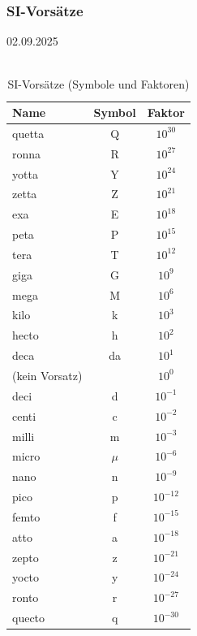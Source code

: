\documentclass[11pt,a4paper,oneside]{article}
\newcommand{\lessondate}[1]{\noindent\hfill\textcolor{MarginalGray}{\textsc{#1}} \\ \vspace{0.5cm}}
\begin{document}
	\subsubsection{SI-Vorsätze}
	\lessondate{02.09.2025}\\
	\begin{table}[ht]
		\centering
		\caption{SI-Vorsätze (Symbole und Faktoren)}
		\label{tab:si-prefixes}
		\begin{tabular}{@{} l c c @{}}
			\toprule
			Name & Symbol & Faktor \\
			\midrule
			quetta  & Q  & \(10^{30}\) \\
			ronna   & R  & \(10^{27}\) \\
			yotta   & Y  & \(10^{24}\) \\
			zetta   & Z  & \(10^{21}\) \\
			exa     & E  & \(10^{18}\) \\
			peta    & P  & \(10^{15}\) \\
			tera    & T  & \(10^{12}\) \\
			giga    & G  & \(10^{9}\)  \\
			mega    & M  & \(10^{6}\)  \\
			kilo    & k  & \(10^{3}\)  \\
			hecto   & h  & \(10^{2}\)  \\
			deca    & da & \(10^{1}\)  \\
			(kein Vorsatz) &  & \(10^{0}\)  \\
			deci    & d  & \(10^{-1}\) \\
			centi   & c  & \(10^{-2}\) \\
			milli   & m  & \(10^{-3}\) \\
			micro   & \(\mu\) & \(10^{-6}\) \\
			nano    & n  & \(10^{-9}\) \\
			pico    & p  & \(10^{-12}\) \\
			femto   & f  & \(10^{-15}\) \\
			atto    & a  & \(10^{-18}\) \\
			zepto   & z  & \(10^{-21}\) \\
			yocto   & y  & \(10^{-24}\) \\
			ronto   & r  & \(10^{-27}\) \\
			quecto  & q  & \(10^{-30}\) \\
			\bottomrule
		\end{tabular}
	\end{table}
	
	
	
\end{document}
